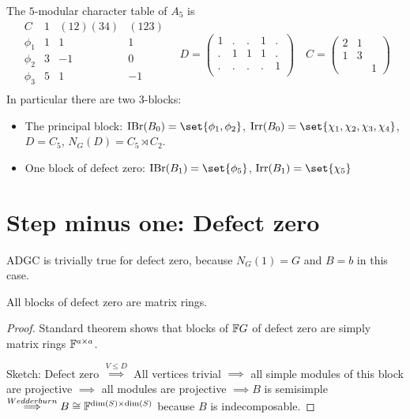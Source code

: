 \documentclass[fontsize=11pt,fleqn,a4paper]{scrartcl}
\begin{document}
\begin{theorem}
The $5$-modular character table of $A_5$ is
\[\begin{array}{c|cccc}
C & 1 & (12)(34) & (123) \\
 \hline\hline
\phi_1 & 1 & 1 & 1 \\
\phi_2 & 3 & -1 & 0 \\
\phi_3 & 5 & 1 & -1 \\
\end{array}
\quad
D=\begin{pmatrix}
1 & . & . & 1 & . \\
. & 1 & 1 & 1 & . \\
. & . & . & . & 1 \\
\end{pmatrix}
\quad
C=\begin{pmatrix}
2 & 1 &   \\
1 & 3 &   \\
  &   & 1
\end{pmatrix}\]
In particular there are two $3$-blocks:
\begin{itemize}
\item The principal block:
$\IBr(B_0)=\set{\phi_1,\phi_2}$,
$\Irr(B_0)=\set{\chi_1,\chi_2,\chi_3,\chi_4}$,
$D=C_5$, $N_G(D) = C_5\rtimes C_2$.
\item One block of defect zero:
$\IBr(B_1)=\set{\phi_5}$,
$\Irr(B_1)=\set{\chi_5}$
\end{itemize}
\end{theorem}

\section{Step minus one: Defect zero}

\begin{remark}
ADGC is trivially true for defect zero, because $N_G(1) = G$ and $B=b$ in this case.
\end{remark}

\begin{theorem}
All blocks of defect zero are matrix rings.
\end{theorem}
\begin{proof}
Standard theorem shows that blocks of $\mathbb{F} G$ of defect zero are simply matrix rings $\mathbb{F}^{a\times a}$.

Sketch: Defect zero $\overset{V\leq D}{\implies}$ All vertices trivial $\implies$ all simple modules of this block are projective $\implies$ all modules are projective $\implies B$ is semisimple $\overset{Wedderburn}{\implies} B \cong \mathbb{F}^{\dim(S)\times\dim(S)}$ because $B$ is indecomposable.
\end{proof}
\end{document}
